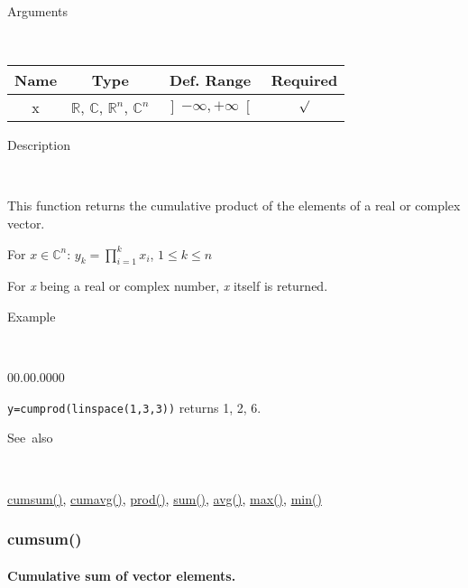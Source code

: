 \begin{description}
\item [Arguments]~
\end{description}
\begin{tabular}{|c|c|c|c|}
\hline 
Name&
Type&
Def. Range&
Required\tabularnewline
\hline
\hline 
x&
$\mathbb{R}$, $\mathbb{C}$, $\mathbb{R}^{n}$, $\mathbb{C}^{n}$&
$\left]-\infty,+\infty\right[$&
$\surd$\tabularnewline
\hline
\end{tabular}

\begin{description}
\item [Description]~
\end{description}
This function returns the cumulative product of the elements of a
real or complex vector.

\medskip{}
For $x\in$$\mathbb{C}^{n}$: $y_{k}=$$\prod\limits _{i=1}^{k}x_{i}$,
$1\leq k\leq n$
\medskip{}

For \textit{x} being a real or complex number, \textit{x} itself is
returned.

\begin{description}
\item [Example]~
\end{description}
\begin{lyxlist}{00.00.0000}
\item [\texttt{y=cumprod(linspace(1,3,3))}]returns 1, 2, 6.
\end{lyxlist}
\begin{description}
\item [See~also]~
\end{description}
\textcolor{blue}{\hyperlink{cumsum}{cumsum()}}\textcolor{black}{,}
\textcolor{blue}{\hyperlink{cumavg}{cumavg()}}\textcolor{black}{,}
\textcolor{blue}{\hyperlink{prod}{prod()}}\textcolor{black}{,} \textcolor{blue}{\hyperlink{sum}{sum()}}\textcolor{black}{,}
\textcolor{blue}{\hyperlink{avg}{avg()}}\textcolor{black}{,} \textcolor{blue}{\hyperlink{max}{max()}}\textcolor{black}{,}
\textcolor{blue}{\hyperlink{min}{min()}}


\newpage
\subsubsection*{\hypertarget{cumsum}{}{\Large cumsum()}}


\paragraph{\label{par:Cumulative-sum}Cumulative sum of vector elements.}

